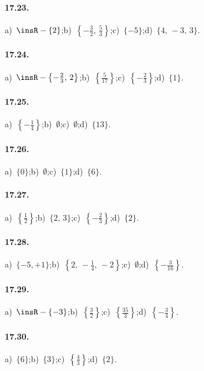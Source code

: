 \paragraph{17.23.}
a)~$\insR-\{2\}$;\quad b)~$\left\{-{\frac{3}{2}}\text{,~}\frac{5}{3}\right\}$;\quad c)~$\{-5\}$;\quad d)~$\{4\text{,~}-3\text{,~}3\}$.

\paragraph{17.24.}
a)~$\insR-\left\{-{\frac{2}{3}}\text{,~}2\right\}$;\quad b)~$\left\{\frac{5}{17}\right\}$;\quad c)~$\left\{-{\frac{2}{3}}\right\}$;\quad d)~$\{1\}$.

\paragraph{17.25.}
a)~$\left\{-{\frac{1}{4}}\right\}$;\quad b)~$\emptyset$;\quad c)~$\emptyset$;\quad d)~$\{13\}$.

\paragraph{17.26.}
a)~$\{0\}$;\quad b)~$\emptyset$;\quad c)~$\{1\}$;\quad d)~$\{6\}$.

\paragraph{17.27.}
a)~$\left\{\frac{1}{2}\right\}$;\quad b)~$\{2\text{,~}3\}$;\quad c)~$\left\{-\frac{2}{3}\right\}$;\quad d)~$\{2\}$.

\paragraph{17.28.}
a)~$\{-5,+1\}$;\quad b)~$\left\{2\text{,~}-\frac{1}{4}\text{,~}-2\right\}$;\quad c)~$\emptyset$;\quad d)~$\left\{-{\frac{3}{16}}\right\}$.

\paragraph{17.29.}
a)~$\insR-\{-3\}$;\quad b)~$\left\{\frac{3}{2}\right\}$;\quad c)~$\left\{\frac{35}{3}\right\}$;\quad d)~$\left\{-{\frac{3}{4}}\right\}$.

\paragraph{17.30.}
a)~$\{6\}$;\quad b)~$\{3\}$;\quad c)~$\left\{\frac{4}{3}\right\}$;\quad d)~$\{2\}$.


